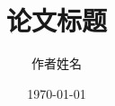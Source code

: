 \documentclass[12pt, a4paper]{article}
\title{论文标题}
\author{作者姓名}
\date{\today}
\begin{document}
\maketitle

\begin{abstract}
    
\end{abstract}

\tableofcontents
\newpage







\end{document}
